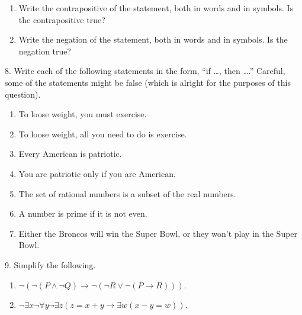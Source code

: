 \documentclass[10pt,]{book}
\theoremstyle{plain}
\theoremstyle{definition}
\theoremstyle{definition}
\theoremstyle{definition}
\numberwithin{equation}{chapter}
\def\imp{\rightarrow}
\begin{document}
\begin{exerciselist}
\begin{enumerate}[label=(\alph*)]
\item\hypertarget{li-1147}{}
                Write the contrapositive of the statement, both in words and in symbols. Is the contrapositive true?
\item\hypertarget{li-1148}{}
                Write the negation of the statement, both in words and in symbols. Is the negation true?
\end{enumerate}
\par\smallskip
\item[8.]\hypertarget{exercise-251}{}
            Write each of the following statements in the form, ``if \dots{}, then \dots{}.'' Careful, some of the statements might be false (which is alright for the purposes of this question).
\leavevmode%
\begin{enumerate}[label=(\alph*)]
\item\hypertarget{li-1153}{}
                To loose weight, you must exercise.
\item\hypertarget{li-1154}{}
                To loose weight, all you need to do is exercise.
\item\hypertarget{li-1155}{}
                Every American is patriotic.
\item\hypertarget{li-1156}{}
                You are patriotic only if you are American.
\item\hypertarget{li-1157}{}
                The set of rational numbers is a subset of the real numbers.
\item\hypertarget{li-1158}{}
                A number is prime if it is not even.
\item\hypertarget{li-1159}{}
                Either the Broncos will win the Super Bowl, or they won't play in the Super Bowl.
\end{enumerate}
\par\smallskip
\item[9.]\hypertarget{exercise-252}{}
            Simplify the following.
\leavevmode%
\begin{enumerate}[label=(\alph*)]
\item\hypertarget{li-1167}{}\(\neg (\neg (P \wedge \neg Q) \imp \neg(\neg R \vee \neg(P \imp R)))\).%
\item\hypertarget{li-1168}{}\(\neg \exists x \neg \forall y \neg \exists z (z = x + y \imp \exists w (x - y = w))\).%
\end{enumerate}

\end{exerciselist}
\end{document}
